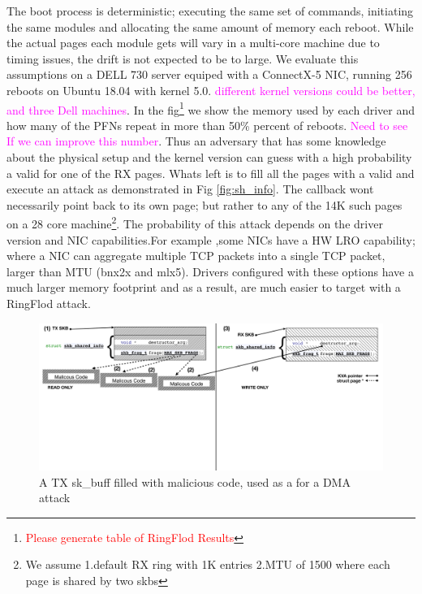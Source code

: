 The boot process is deterministic; executing the same set of commands, initiating the same modules and allocating the same amount of memory each reboot. While the actual pages each module gets will vary in a multi-core machine due to timing issues, the drift is not expected to be to large. We evaluate this assumptions on a DELL 730 server equiped with a ConnectX-5 NIC, running 256 reboots on Ubuntu 18.04 with kernel 5.0. \textcolor{magenta}{different kernel versions could be better, and three Dell machines}. In the fig\footnote{\textcolor{red}{Please generate table of RingFlod Results}} we show the memory used by each driver and how many of the PFNs repeat in more than 50\% percent of reboots. \textcolor{magenta}{Need to see If we can improve this number}. Thus an adversary that has some knowledge about the physical setup and the kernel version can guess with a high probability a valid \kva for one of the RX pages. Whats left is to fill all the pages with a valid \mabaf and execute an attack as demonstrated in Fig \ref{fig:sh_info}. The callback wont necessarily point back to its own page; but rather to any of the 14K such pages on a 28 core machine\footnote{We assume 1.default RX ring with 1K entries 2.MTU of 1500 where each page is shared by two skbs}. The probability of this attack depends on the driver version and NIC capabilities.For example ,some NICs have a HW LRO capability; where a NIC can aggregate multiple TCP packets into a single TCP packet, larger than MTU \cite{mlx5_lro}(bnx2x and mlx5). Drivers configured with these options have a much larger memory footprint and as a result, are much easier to target with a RingFlod attack.
\begin{figure}[t]
    \centering
    \includegraphics[width=\linewidth]{figs/accomplice.pdf}
    \caption{A TX sk\_buff filled with malicious code, used as a \means for a DMA attack}
    \label{fig:payload}
\end{figure}
